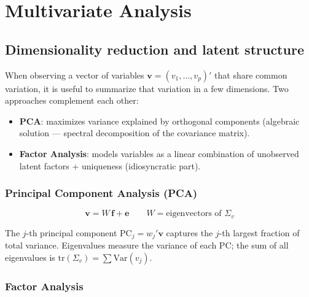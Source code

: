 \chapter{Multivariate Analysis}
\label{cap:multivariada}

\section{Dimensionality reduction and latent structure}

When observing a vector of variables $\mathbf{v} = (v_1,\ldots,v_p)'$
that share common variation, it is useful to summarize that variation in a few
dimensions. Two approaches complement each other:

\begin{itemize}
  \item \textbf{PCA}: maximizes variance explained by orthogonal components
  (algebraic solution — spectral decomposition of the covariance matrix).
  \item \textbf{Factor Analysis}: models variables as a linear combination of
  unobserved latent factors + uniqueness (idiosyncratic part).
\end{itemize}

\subsection*{Principal Component Analysis (PCA)}

\[
  \mathbf{v} = W\,\mathbf{f} + \mathbf{e}
  \qquad W = \text{eigenvectors of } \Sigma_v
\]

The $j$-th principal component $\text{PC}_j = w_j'\mathbf{v}$ captures the
$j$-th largest fraction of total variance. Eigenvalues measure the variance
of each PC; the sum of all eigenvalues is $\mathrm{tr}(\Sigma_v) = \sum \mathrm{Var}(v_j)$.

\subsection*{Factor Analysis}

